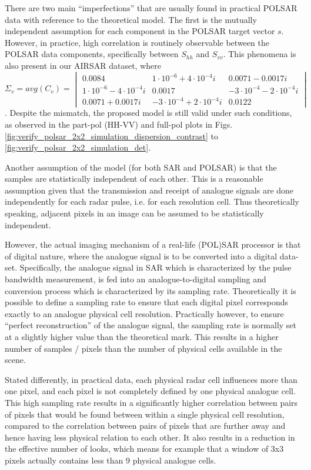 There are two main ``imperfections'' that are usually found in practical POLSAR data with reference to the theoretical model.
The first is the mutually independent assumption for each component in the POLSAR target vector $s$.
However, in practice, high correlation is routinely observable between the POLSAR data components,
  specifically between $S_{hh}$ and $S_{vv}$.
This phenomena is also present in our AIRSAR dataset, where
${\Sigma_v = avg(C_v) = \begin{vmatrix} 0.0084 & 1 \cdot 10^{-6} + 4 \cdot 10^{-4} i & 0.0071 - 0.0017 i \\ 1 \cdot 10^{-6} - 4 \cdot 10^{-4} i & 0.0017 & -3 \cdot 10^{-4} - 2 \cdot 10^{-4} i \\ 0.0071 + 0.0017 i & -3 \cdot 10^{-4} + 2 \cdot 10^{-4} i & 0.0122 \end{vmatrix}}$.
Despite the mismatch, the proposed model  is still valid under such conditions, as observed in the part-pol (HH-VV) and full-pol
plots in Figs. \ref{fig:verify_polsar_2x2_simulation_dispersion_contrast} to \ref{fig:verify_polsar_2x2_simulation_det}.

Another assumption of the model (for both SAR and POLSAR) is that the samples are statistically independent of each other.
This is a reasonable assumption given that 
  the transmission and receipt of analogue signals are done independently for each radar pulse, i.e. for each resolution cell.
Thus theoretically speaking, adjacent pixels in an image can be assumed to be statistically independent.

However, the actual imaging mechanism of a real-life (POL)SAR processor is that of digital nature,
where the analogue signal is to be converted into a digital data-set. 
Specifically, the analogue signal in SAR 
  which is characterized by the pulse bandwidth measurement,
  is fed into an analogue-to-digital sampling and conversion process 
  which is characterized by its sampling rate.
Theoretically it is possible to define a sampling rate to ensure that each digital pixel corresponds exactly to an analogue physical cell resolution.
Practically however, to ensure ``perfect reconstruction'' of the analogue signal, the sampling rate is normally set at a slightly higher value than the theoretical mark.
This results in a higher number of samples / pixels than the number of physical cells available in the scene.  

Stated differently, in practical data, each physical radar cell influences more than one pixel,
  and each pixel is not completely defined by one physical analogue cell.
This high sampling rate results in 
  a significantly higher correlation between pairs of pixels that would be found between within a single physical cell resolution, 
  compared to the correlation between pairs of pixels that are further away and hence having less physical relation to each other.
It also results in a reduction in the effective number of looks, 
  which means for example that a window of 3x3 pixels actually contains less than 9 physical analogue cells.
  
